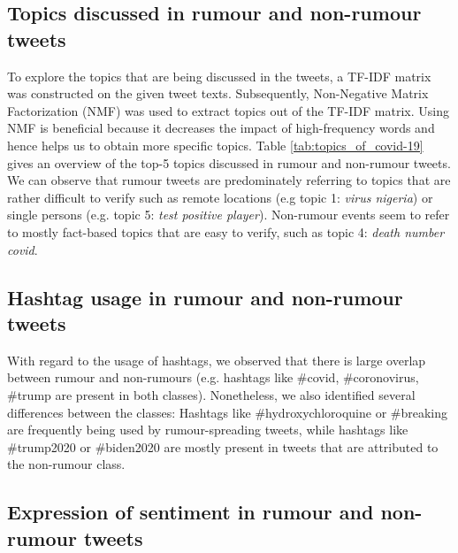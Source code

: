 \documentclass[11pt,a4paper]{article}
\begin{document}
\subsection{Topics discussed in rumour and non-rumour tweets}
To explore the topics that are being discussed in the tweets, a TF-IDF matrix was constructed on the given tweet texts. Subsequently, Non-Negative Matrix Factorization (NMF) was used to extract topics out of the TF-IDF matrix. Using NMF is beneficial because it decreases the impact of high-frequency words and hence helps us to obtain more specific topics.
\newline
Table \ref{tab:topics_of_covid-19} gives an overview of the top-5 topics discussed in rumour and non-rumour tweets. We can observe that rumour tweets are predominately referring to topics that are rather difficult to verify such as remote locations (e.g topic 1: \textit{virus nigeria}) or single persons (e.g. topic 5: \textit{test positive player}). Non-rumour events seem to refer to mostly fact-based topics that are easy to verify, such as topic 4: \textit{death number covid}.

\subsection{Hashtag usage in rumour and non-rumour tweets} 
With regard to the usage of hashtags, we observed that there is large overlap between rumour and non-rumours (e.g. hashtags like \#covid, \#coronovirus, \#trump are present in both classes). Nonetheless, we also identified several differences between the classes: Hashtags like \#hydroxychloroquine or \#breaking are frequently being used by rumour-spreading tweets, while hashtags like \#trump2020 or \#biden2020 are mostly present in tweets that are attributed to the non-rumour class.

\subsection{Expression of sentiment in rumour and non-rumour tweets}
\end{document}
